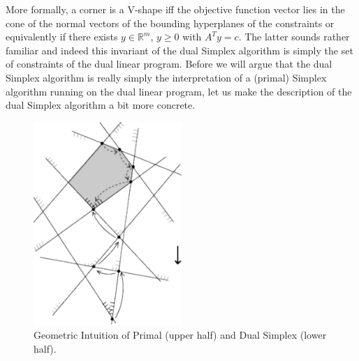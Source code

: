 \documentclass{article}
\begin{document}
More formally, a corner is a V-shape iff the objective function vector lies in the cone of the normal vectors of the bounding hyperplanes of the constraints or equivalently if there exists $y\in \mathbb{R}^m$, $y\geq 0$ with $A^Ty=c$. The latter sounds rather familiar and indeed this invariant of the dual Simplex algorithm is simply the set of constraints of the dual linear program. Before we will argue that the dual Simplex algorithm is really simply the interpretation of a (primal) Simplex algorithm running on the dual linear program, let us make  the description of the dual Simplex algorithm a bit more concrete.



\begin{figure}
\begin{center}
\includegraphics[width=0.5\textwidth]{Figs/PrimalDualSimplex.pdf}
\caption{Geometric Intuition of Primal (upper half) and Dual Simplex (lower half).}\label{fig:PrimalDualSimplex}
\end{center}
\end{figure}
\end{document}
